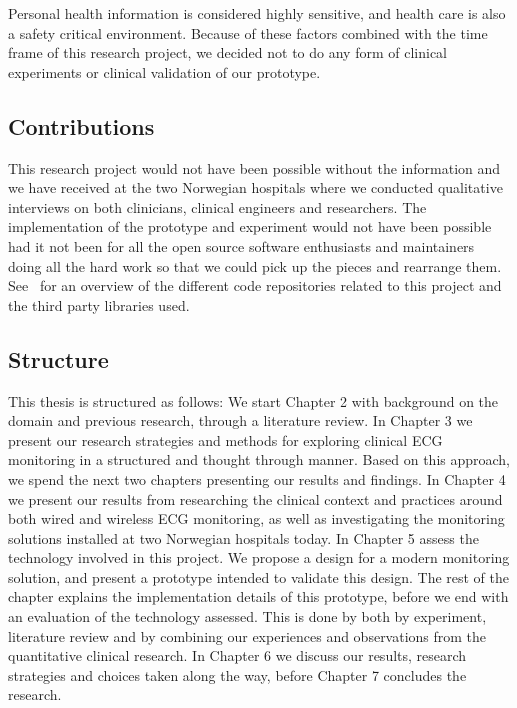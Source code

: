 Personal health information is considered highly sensitive, and health care is also a safety critical environment. Because of these factors combined with the time frame of this research project, we decided not to do any form of clinical experiments or clinical validation of our prototype.

\subsection{Contributions}

This research project would not have been possible without the information and we have received at the two Norwegian hospitals where we conducted qualitative interviews on both clinicians, clinical engineers and researchers. The implementation of the prototype and experiment would not have been possible had it not been for all the open source software enthusiasts and maintainers doing all the hard work so that we could pick up the pieces and rearrange them. See~\cite{rix1Github} for an overview of the different code repositories related to this project and the third party libraries used.

\label{sub:contributions}

\subsection{Structure} 

This thesis is structured as follows: We start Chapter 2 with background on the domain and previous research, through a literature review. In Chapter 3 we present our research strategies and methods for exploring clinical ECG monitoring in a structured and thought through manner. Based on this approach, we spend the next two chapters presenting our results and findings. In Chapter 4 we present our results from researching the clinical context and practices around both wired and wireless ECG monitoring, as well as investigating the monitoring solutions installed at two Norwegian hospitals today. In Chapter 5 assess the technology involved in this project. We propose a design for a modern monitoring solution, and present a prototype intended to validate this design. The rest of the chapter explains the implementation details of this prototype, before we end with an evaluation of the technology assessed. This is done by both by experiment, literature review and by combining our experiences and observations from the quantitative clinical research. In Chapter 6 we discuss our results, research strategies and choices taken along the way, before Chapter 7 concludes the research.

\label{sub:structure}

